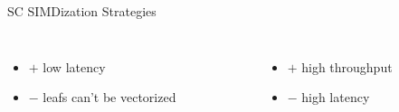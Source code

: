 \begin{frame}{SC SIMDization Strategies}
\begin{columns}[t]
\begin{column}[T]{5.0cm}
\begin{figure}[!h]
{
      }
      \end{figure}
    \end{column}
  \end{columns}
  \vfill
  \pause
  \begin{columns}[t]
    \begin{column}[T]{5.0cm}
      \begin{itemize}
        \item $+$ low latency
        \item $-$ leafs can't be vectorized
      \end{itemize}
    \end{column}
    \begin{column}[T]{5.0cm}
      \begin{itemize}
        \item $+$ high throughput
        \item $-$ high latency
      \end{itemize}
    \end{column}
  \end{columns}
  \vfill
\end{frame}

